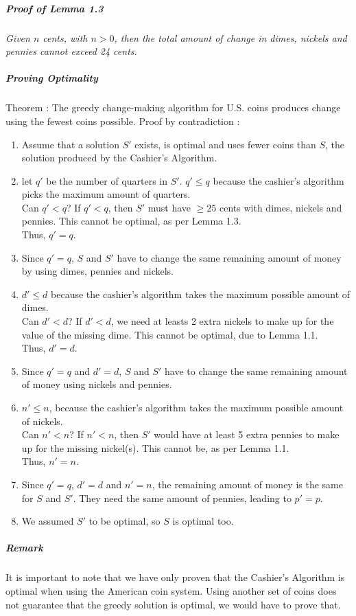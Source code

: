 \documentclass[10pt,a4paper]{book}
\begin{document}
\subparagraph*{Proof of Lemma 1.3}
\textit{Given $n$ cents, with $n > 0$, then the total amount of change in dimes, nickels and pennies cannot exceed 24 cents.}\\
\subparagraph*{Proving Optimality}
Theorem : The greedy change-making algorithm for U.S. coins produces change using the fewest coins possible.
Proof by contradiction :
\begin{enumerate}
\item Assume that a solution $S'$ exists, is optimal and uses fewer coins than $S$, the solution produced by the Cashier's Algorithm.
\item let $q'$ be the number of quarters in $S'$. $q' \leqslant q$ because the cashier's algorithm picks the maximum amount of quarters.\\
Can $q' < q$? If $q' < q$, then $S'$ must have $\geqslant 25$ cents with dimes, nickels and pennies. This cannot be optimal, as per Lemma 1.3.\\
Thus, $q' = q$.
\item Since $q' = q$, $S$ and $S'$ have to change the same remaining amount of money by using dimes, pennies and nickels.
\item $d' \leqslant d$ because the cashier's algorithm takes the maximum possible amount of dimes.\\
Can $d' < d$? If $d' < d$, we need at leasts 2 extra nickels to make up for the value of the missing dime. This cannot be optimal, due to Lemma 1.1.\\
Thus, $d' = d$.
\item Since $q' = q$ and $d' = d$, $S$ and $S'$ have to change the same remaining amount of money using nickels and pennies.
\item $n' \leqslant n$, because the cashier's algorithm takes the maximum possible amount of nickels.\\
Can $n' < n$? If $n' < n$, then $S'$ would have at least 5 extra pennies to make up for the missing nickel(s). This cannot be, as per Lemma 1.1.\\
Thus, $n' = n$.
\item Since $q' = q$, $d' = d$ and $n' = n$, the remaining amount of money is the same for $S$ and $S'$. They need the same amount of pennies, leading to $p' = p$.
\item We assumed $S'$ to be optimal, so $S$ is optimal too.
\end{enumerate}
\subparagraph*{Remark}
It is important to note that we have only proven that the Cashier's Algorithm is optimal when using the American coin system. Using another set of coins does not guarantee that the greedy solution is optimal, we would have to prove that. 
\end{document}
